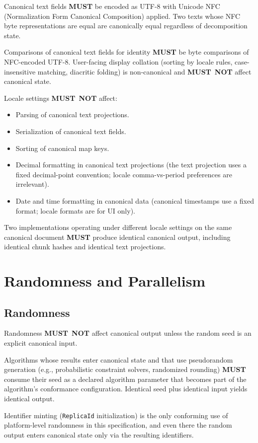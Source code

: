 \documentclass[11pt,letterpaper]{report}
\newcounter{requirement}[chapter]
\newcommand{\MUST}{\textbf{MUST}}
\newcommand{\MUSTNOT}{\textbf{MUST}\nobreak\ \textbf{NOT}}
\begin{document}
\begin{requirement}
  \label{req:determinism:unicode-canonicalization}
  Canonical text fields \MUST{} be encoded as UTF-8 with Unicode
  NFC (Normalization Form Canonical Composition) applied. Two
  texts whose NFC byte representations are equal are canonically
  equal regardless of decomposition state.

  Comparisons of canonical text fields for identity \MUST{} be
  byte comparisons of NFC-encoded UTF-8. User-facing display
  collation (sorting by locale rules, case-insensitive matching,
  diacritic folding) is non-canonical and \MUSTNOT{} affect
  canonical state.

  Locale settings \MUSTNOT{} affect:
  \begin{itemize}
    \item Parsing of canonical text projections.
    \item Serialization of canonical text fields.
    \item Sorting of canonical map keys.
    \item Decimal formatting in canonical text projections (the
      text projection uses a fixed decimal-point convention;
      locale comma-vs-period preferences are irrelevant).
    \item Date and time formatting in canonical data (canonical
      timestamps use a fixed format; locale formats are for UI
      only).
  \end{itemize}

  Two implementations operating under different locale settings
  on the same canonical document \MUST{} produce identical
  canonical output, including identical chunk hashes and
  identical text projections.
\end{requirement}

\section{Randomness and Parallelism}
\label{sec:det:rng}

\subsection{Randomness}

\begin{requirement}
  \label{req:determinism:canonical-random-seeds}
  Randomness \MUSTNOT{} affect canonical output unless the
  random seed is an explicit canonical input.

  Algorithms whose results enter canonical state and that use
  pseudorandom generation (e.g., probabilistic constraint solvers,
  randomized rounding) \MUST{} consume their seed as a declared
  algorithm parameter that becomes part of the algorithm's
  conformance configuration. Identical seed plus identical input
  yields identical output.

  Identifier minting (\texttt{ReplicaId} initialization) is the
  only conforming use of platform-level randomness in this
  specification, and even there the random output enters
  canonical state only via the resulting identifiers.
\end{requirement}
\end{document}
